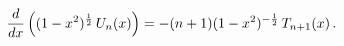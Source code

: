 \[\frac{d}{dx}\left((1-x^{2})^{\frac{1}{2}}\mathop{U_{n}\/}\nolimits\!\left(x%
\right)\right)=-(n+1){(1-x^{2})^{-\frac{1}{2}}}\mathop{T_{n+1}\/}\nolimits\!%
\left(x\right).\]